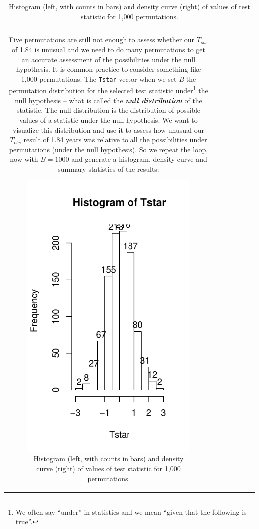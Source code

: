 \documentclass[]{book}
\let\rmarkdownfootnote\footnote%
\def\footnote{\protect\rmarkdownfootnote}
\theoremstyle{definition}
\theoremstyle{definition}
\theoremstyle{remark}
\begin{document}
\begin{longtable}[]{@{}ccccccc@{}}
\begin{minipage}[b]{0.10\columnwidth}
Five permutations are still not enough to assess whether our \(T_{obs}\)
of 1.84 is unusual and we need to do many permutations to get an
accurate assessment of the possibilities under the null hypothesis. It
is common practice to consider something like 1,000 permutations. The
\texttt{Tstar} vector when we set \emph{B} the permutation distribution
for the selected test statistic under\footnote{We often say ``under'' in
  statistics and we mean ``given that the following is true''.} the null
hypothesis -- what is called the \textbf{\emph{null distribution}} of
the statistic. The null distribution is the distribution of possible
values of a statistic under the null hypothesis. We want to visualize
this distribution and use it to assess how unusual our \(T_{obs}\)
result of 1.84 years was relative to all the possibilities under
permutations (under the null hypothesis). So we repeat the loop, now
with \(B=1000\) and generate a histogram, density curve and summary
statistics of the results:




\begin{figure}
\centering
\includegraphics{02-reintroductionToStatistics_files/figure-latex/Figure2-9-1.pdf}
\caption{\label{fig:Figure2-9}Histogram (left, with counts in bars) and density curve
(right) of values of test statistic for 1,000 permutations.}
\end{figure}


\end{minipage}
\end{longtable}
\end{document}
